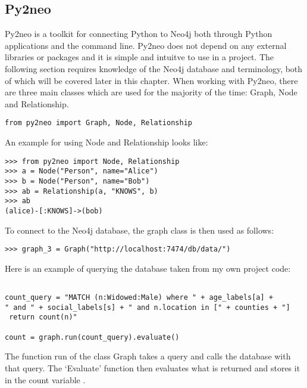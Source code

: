 \subsection{Py2neo}
Py2neo is a toolkit for connecting Python to Neo4j both through Python applications and the command line. Py2neo does not depend on any external libraries or packages and it is simple and intuitve to use in a project. The following section requires knowledge of the Neo4j database and terminology, both of which will be covered later in this chapter.
When working with Py2neo,  there are three main classes which are used for the majority of the time: Graph, Node and Relationship.
\begin{verbatim}
from py2neo import Graph, Node, Relationship
\end{verbatim}
An example for using Node and Relationship looks like:
\begin{verbatim}
>>> from py2neo import Node, Relationship
>>> a = Node("Person", name="Alice")
>>> b = Node("Person", name="Bob")
>>> ab = Relationship(a, "KNOWS", b)
>>> ab
(alice)-[:KNOWS]->(bob)
\end{verbatim}
To connect to the Neo4j database, the graph class is then used as follows: 
\begin{verbatim}
>>> graph_3 = Graph("http://localhost:7474/db/data/")
\end{verbatim}
Here is an example of querying the database taken from my own project code:
\begin{verbatim}

count_query = "MATCH (n:Widowed:Male) where " + age_labels[a] + 
" and " + social_labels[s] + " and n.location in [" + counties + "]
 return count(n)"

count = graph.run(count_query).evaluate()
\end{verbatim}
The function run of the class Graph takes a query and calls the database with that query. The ‘Evaluate’ function  then evaluates what is returned and stores it in the count variable \cite{py2neo}.
